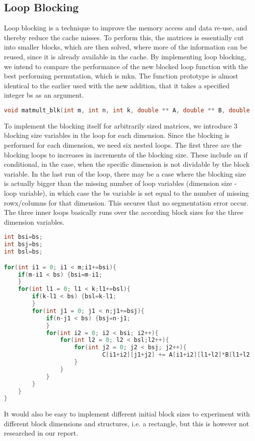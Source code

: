 \subsection{Loop Blocking}

Loop blocking is a technique to improve the memory access and data re-use, and thereby reduce the cache misses. To perform this, the matrices is essentially cut into smaller blocks, which are then solved, where more of the information can be reused, since it is already available in the cache. By implementing loop blocking, we intend to compare the performance of the new blocked loop function with the best performing permutation, which is mkn. The function prototype is almost identical to the earlier used with the new addition, that it takes a specified integer bs as an argument.

\begin{lstlisting}[language=C++, caption=Function Prototype]
void matmult_blk(int m, int n, int k, double ** A, double ** B, double ** C, int bs)
\end{lstlisting}

To implement the blocking itself for arbitrarily sized matrices, we introduce 3 blocking size variables in the loop for each dimension. Since the blocking is performed for each dimension, we need six nested loops. The first three are the blocking loops to increases in increments of the blocking size. These include an if conditional, in the case, when the specific dimension is not dividable by the block variable. In the last run of the loop, there may be a case where the blocking size is actually bigger than the missing number of loop variables (dimension size - loop variable), in which case the bs variable is set equal to the number of missing rowx/columns for that dimension. This secures that no segmentation error occur.\\

The three inner loops basically runs over the according block sizes for the three dimension variables.

\begin{lstlisting}[language=C++, caption=Function Prototype]
int bsi=bs;
int bsj=bs;
int bsl=bs;

for(int i1 = 0; i1 < m;i1+=bsi){
	if(m-i1 < bs) {bsi=m-i1;
	}
	for(int l1 = 0; l1 < k;l1+=bsl){
		if(k-l1 < bs) {bsl=k-l1;
		}
		for(int j1 = 0; j1 < n;j1+=bsj){
			if(n-j1 < bs) {bsj=n-j1;
			}
			for(int i2 = 0; i2 < bsi; i2++){	
				for(int l2 = 0; l2 < bsl;l2++){	
					for(int j2 = 0; j2 < bsj; j2++){	
							C[i1+i2][j1+j2] += A[i1+i2][l1+l2]*B[l1+l2][j1+j2];
					}
				}
			}
		}
	}
}
\end{lstlisting}

It would also be easy to implement different initial block sizes to experiment with different block dimensions and structures, i.e. a rectangle, but this is however not researched in our report. 